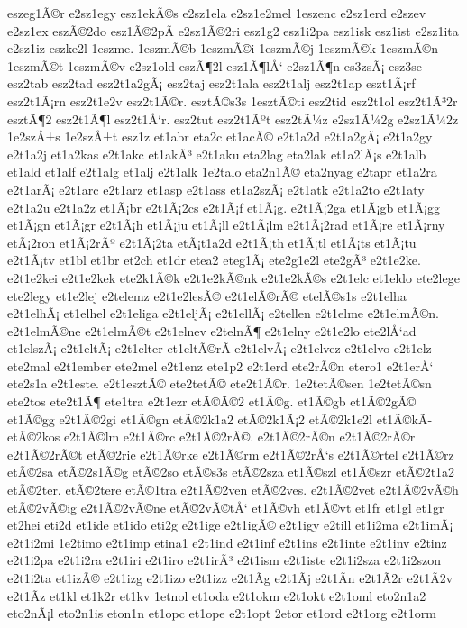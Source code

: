 {eszeg1Ã©r
e2sz1egy
esz1ekÃ©s
e2sz1ela
e2sz1e2mel
1eszenc
e2sz1erd
e2szev
e2sz1ex
eszÃ©2do
esz1Ã©2pÃ­
e2sz1Ã©2ri
esz1g2
esz1i2pa
esz1isk
esz1ist
e2sz1ita
e2sz1iz
eszke2l
1eszme.
1eszmÃ©b
1eszmÃ©i
1eszmÃ©j
1eszmÃ©k
1eszmÃ©n
1eszmÃ©t
1eszmÃ©v
e2sz1old
eszÃ¶2l
esz1Ã¶lÅ‘
e2sz1Ã¶n
es3zsÃ¡
esz3se
esz2tab
esz2tad
esz2t1a2gÃ¡
esz2taj
esz2t1ala
esz2t1alj
esz2t1ap
eszt1Ã¡rf
esz2t1Ã¡rn
esz2t1e2v
esz2t1Ã©r.
esztÃ©s3s
1esztÃ©ti
esz2tid
esz2t1ol
esz2t1Ã³2r
esztÃ¶2
esz2t1Ã¶l
esz2t1Å‘r.
esz2tut
esz2t1Ãºt
esz2tÃ¼z
e2sz1Ã¼2g
e2sz1Ã¼2z
1e2szÅ±s
1e2szÅ±t
esz1z
et1abr
eta2c
et1acÃ©
e2t1a2d
e2t1a2gÃ¡
e2t1a2gy
e2t1a2j
et1a2kas
e2t1akc
et1akÃ³
e2t1aku
eta2lag
eta2lak
et1a2lÃ¡s
e2t1alb
et1ald
et1alf
e2t1alg
et1alj
e2t1alk
1e2talo
eta2n1Ã©
eta2nyag
e2tapr
et1a2ra
e2t1arÃ¡
e2t1arc
e2t1arz
et1asp
e2t1ass
et1a2szÃ¡
e2t1atk
e2t1a2to
e2t1aty
e2t1a2u
e2t1a2z
et1Ã¡br
e2t1Ã¡2cs
e2t1Ã¡f
et1Ã¡g.
e2t1Ã¡2ga
et1Ã¡gb
et1Ã¡gg
et1Ã¡gn
et1Ã¡gr
e2t1Ã¡h
et1Ã¡ju
et1Ã¡ll
e2t1Ã¡lm
e2t1Ã¡2rad
et1Ã¡re
et1Ã¡rny
etÃ¡2ron
et1Ã¡2rÃº
e2t1Ã¡2ta
etÃ¡t1a2d
e2t1Ã¡th
et1Ã¡tl
et1Ã¡ts
et1Ã¡tu
e2t1Ã¡tv
et1bl
et1br
et2ch
et1dr
etea2
eteg1Ã¡
ete2g1e2l
ete2gÃ³
e2t1e2ke.
e2t1e2kei
e2t1e2kek
ete2k1Ã©k
e2t1e2kÃ©nk
e2t1e2kÃ©s
e2t1elc
et1eldo
ete2lege
ete2legy
et1e2lej
e2telemz
e2t1e2lesÃ©
e2t1elÃ©rÃ©
etelÃ©s1s
e2t1elha
e2t1elhÃ¡
et1elhel
e2t1eliga
e2t1eljÃ¡
e2t1ellÃ¡
e2tellen
e2t1elme
e2t1elmÃ©n.
e2t1elmÃ©ne
e2t1elmÃ©t
e2t1elnev
e2telnÃ¶
e2t1elny
e2t1e2lo
ete2lÅ‘ad
et1elszÃ¡
e2t1eltÃ¡
e2t1elter
et1eltÃ©rÃ­
e2t1elvÃ¡
e2t1elvez
e2t1elvo
e2t1elz
ete2mal
e2t1ember
ete2mel
e2t1enz
ete1p2
e2t1erd
ete2rÃ©n
etero1
e2t1erÅ‘
ete2s1a
e2t1este.
e2t1esztÃ©
ete2tetÃ©
ete2t1Ã©r.
1e2tetÃ©sen
1e2tetÃ©sn
ete2tos
ete2t1Ã¶
ete1tra
e2t1ezr
etÃ©Ã©2
et1Ã©g.
et1Ã©gb
et1Ã©2gÃ©
et1Ã©gg
e2t1Ã©2gi
et1Ã©gn
etÃ©2k1a2
etÃ©2k1Ã¡2
etÃ©2k1e2l
et1Ã©kÃ­
etÃ©2kos
e2t1Ã©lm
e2t1Ã©rc
e2t1Ã©2rÃ©.
e2t1Ã©2rÃ©n
e2t1Ã©2rÃ©r
e2t1Ã©2rÃ©t
etÃ©2rie
e2t1Ã©rke
e2t1Ã©rm
e2t1Ã©2rÅ‘s
e2t1Ã©rtel
e2t1Ã©rz
etÃ©2sa
etÃ©2s1Ã©g
etÃ©2so
etÃ©s3s
etÃ©2sza
et1Ã©szl
et1Ã©szr
etÃ©2t1a2
etÃ©2ter.
etÃ©2tere
etÃ©1tra
e2t1Ã©2ven
etÃ©2ves.
e2t1Ã©2vet
e2t1Ã©2vÃ©h
etÃ©2vÃ©ig
e2t1Ã©2vÃ©ne
etÃ©2vÃ©tÅ‘
et1Ã©vh
et1Ã©vt
et1fr
et1gl
et1gr
et2hei
eti2d
et1ide
et1ido
eti2g
e2t1ige
e2t1igÃ©
e2t1igy
e2till
et1i2ma
e2t1imÃ¡
e2t1i2mi
1e2timo
e2t1imp
etina1
e2t1ind
e2t1inf
e2t1ins
e2t1inte
e2t1inv
e2tinz
e2t1i2pa
e2t1i2ra
e2t1iri
e2t1iro
e2t1irÃ³
e2t1ism
e2t1iste
e2t1i2sza
e2t1i2szon
e2t1i2ta
et1izÃ©
e2t1izg
e2t1izo
e2t1izz
e2t1Ã­g
e2t1Ã­j
e2t1Ã­n
e2t1Ã­2r
e2t1Ã­2v
e2t1Ã­z
et1kl
et1k2r
et1kv
1etnol
et1oda
e2t1okm
e2t1okt
e2t1oml
eto2n1a2
eto2nÃ¡l
eto2n1is
eton1n
et1opc
et1ope
e2t1opt
2etor
et1ord
e2t1org
e2t1orm
}
